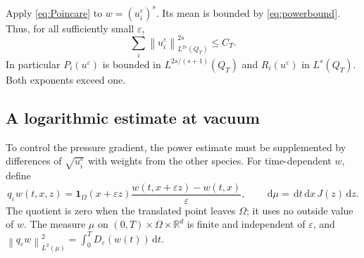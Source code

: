 \documentclass[11pt]{article}
\newcommand{\R}{\mathbb R}
\newcommand{\eps}{\varepsilon}
\newcommand{\dd}{\,\mathrm d}
\newcommand{\Om}{\Omega}
\newcommand{\De}{D_\eps}
\newcommand{\qe}{q_\eps}
\newcommand{\norm}[1]{\left\lVert#1\right\rVert}
\begin{document}
Apply \eqref{eq:Poincare} to $w=(u_i^\eps)^s$. Its mean is bounded by
\eqref{eq:powerbound}. Thus, for all sufficiently small $\eps$,
\begin{equation}\label{eq:L2s}
 \sum_i\norm{u_i^\eps}_{L^{2s}(Q_T)}^{2s}\leq C_T.
\end{equation}
In particular $P_i(u^\eps)$ is bounded in $L^{2s/(s+1)}(Q_T)$ and
$R_i(u^\eps)$ in $L^s(Q_T)$. Both exponents exceed one.

\subsection{A logarithmic estimate at vacuum}

To control the pressure gradient, the power estimate must be supplemented by
differences of $\sqrt{u_i^\eps}$ with weights from the other species.
For time-dependent $w$, define
\[
 \qe w(t,x,z)=\mathbf1_\Om(x+\eps z)
              \frac{w(t,x+\eps z)-w(t,x)}{\eps},\qquad
 \dd\mu=\dd t\dd x\,J(z)\dd z.
\]
The quotient is zero when the translated point leaves $\Om$; it uses no
outside value of $w$. The measure $\mu$ on
$(0,T)\times\Om\times\R^d$ is finite and independent of $\eps$, and
$\norm{\qe w}_{L^2(\mu)}^2=\int_0^T\De(w(t))\dd t$.
\end{document}
